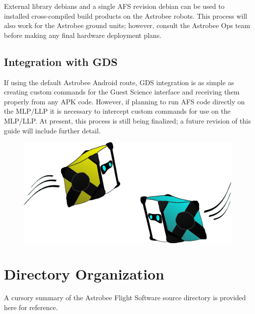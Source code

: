 \documentclass{article}
\begin{document}
External library debians and a single AFS revision debian can be used to installed cross-compiled build products on the Astrobee robots. This process will also work for the Astrobee ground units; however, consult the Astrobee Ops team before making any final hardware deployment plans.

\subsection{Integration with GDS}

If using the default Astrobee Android route, GDS integration is as simple as creating custom commands for the Guest Science interface and receiving them properly from any APK code. However, if planning to run AFS code directly on the MLP/LLP it is necessary to intercept custom commands for use on the MLP/LLP. At present, this process is still being finalized; a future revision of this guide will include further detail.
\newpage
\vspace{4cm}
\begin{figure}[hb!]
	\centering
	\includegraphics[width=1.0\textwidth]{img/whee.png}
\end{figure}


\clearpage


\newpage

\appendix
\section{Directory Organization}
\label{section:directory}
A cursory summary of the Astrobee Flight Software source directory is provided here for reference.\\
\end{document}
